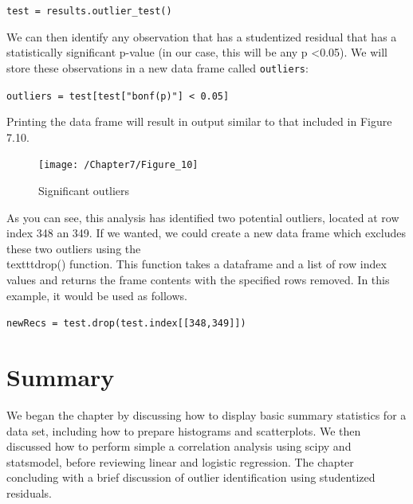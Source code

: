 \documentclass{book}
\begin{document}
\texttt{test = results.outlier\_test()}

We can then identify any observation that has a studentized residual that has a statistically significant p-value (in our case, this will be any p \textless 0.05). We will store these observations in a new data frame called \texttt{outliers}:

\texttt{outliers = test[test["bonf(p)"] < 0.05]}

Printing the data frame will result in output similar to that included in Figure 7.10.

\begin{figure}[h]
	\caption{Significant outliers}
	\centering\texttt{[image: /Chapter7/Figure\_10]}
\end{figure}

As you can see, this analysis has identified two potential outliers, located at row index 348 an 349. If we wanted, we could create a new data frame which excludes these two outliers using the \\texttt{drop()} function. This function takes a dataframe and a list of row index values and returns the frame contents with the specified rows removed. In this example, it would be used as follows.

\texttt{newRecs = test.drop(test.index[[348,349]])}

\section{Summary}

We began the chapter by discussing how to display basic summary statistics for a data set, including how to prepare histograms and scatterplots. We then discussed how to perform simple a correlation analysis using scipy and statsmodel, before reviewing linear and logistic regression. The chapter concluding with a brief discussion of outlier identification using studentized residuals.
\end{document}
